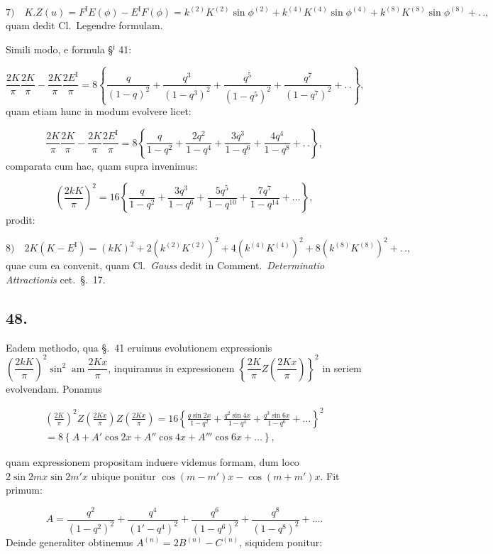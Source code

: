 \documentclass{article}
\begin{document}
\[
\text{7)}\quad K.Z(u)=F^{\mathrm{I}}E(\phi)-E^{\mathrm{I}}F(\phi)=k^{(2)}K^{(2)}\sin\phi^{(2)}+k^{(4)}K^{(4)}\sin\phi^{(4)}+k^{(8)}K^{(8)}\sin\phi^{(8)}+.\,.,
\]
quam dedit Cl.\ Legendre formulam.

Simili modo, e formula §$^{\mathrm{i}}$ 41:

\[
\frac{2K}{\pi}\frac{2K}{\pi}-\frac{2K}{\pi}\frac{2E^{\mathrm{I}}}{\pi}=8\left\{\frac{q}{(1-q)^{2}}+\frac{q^{3}}{(1-q^{3})^{2}}+\frac{q^{5}}{(1-q^{5})^{2}}+\frac{q^{7}}{(1-q^{7})^{2}}+.\,.\right\},
\]
quam etiam hunc in modum evolvere licet:

\[
\frac{2K}{\pi}\frac{2K}{\pi}-\frac{2K}{\pi}\frac{2E^{\mathrm{I}}}{\pi}=8\left\{\frac{q}{1-q^{2}}+\frac{2q^{2}}{1-q^{4}}+\frac{3q^{3}}{1-q^{6}}+\frac{4q^{4}}{1-q^{8}}+.\,.\right\},
\]
comparata cum hac, quam supra invenimus:

\[
\left(\frac{2kK}{\pi}\right)^{2}=16\left\{\frac{q}{1-q^{2}}+\frac{3q^{3}}{1-q^{6}}+\frac{5q^{5}}{1-q^{10}}+\frac{7q^{7}}{1-q^{14}}+\ldots\right\},
\]
prodit:

\[
\text{8)}\quad2K(K-E^{\mathrm{I}})=(kK)^{2}+2(k^{(2)}K^{(2)})^{2}+4(k^{(4)}K^{(4)})^{2}+8(k^{(8)}K^{(8)})^{2}+.\,.,
\]
quae cum ea convenit, quam Cl.\ \emph{Gauss} dedit in Comment.\ \emph{Determinatio Attractionis} cet.\ §.\ 17.

\subsection*{48.}

Eadem methodo, qua §.\ 41 eruimus evolutionem expressionis $\left(\dfrac{2kK}{\pi}\right)^{2}\sin^{2}\operatorname{am}\dfrac{2Kx}{\pi}$, inquiramus in expressionem $\left\{\dfrac{2K}{\pi}Z\left(\dfrac{2Kx}{\pi}\right)\right\}^{2}$ in seriem evolvendam. Ponamus

\[
\begin{gathered}
\left(\frac{2K}{\pi}\right)^{2}Z\left(\frac{2Kx}{\pi}\right)Z\left(\frac{2Kx}{\pi}\right)=16\left\{\frac{q\sin2x}{1-q^{2}}+\frac{q^{2}\sin4x}{1-q^{4}}+\frac{q^{3}\sin6x}{1-q^{6}}+\ldots\right\}^{2}\\[1ex]
=8\left\{A+A'\cos2x+A''\cos4x+A'''\cos6x+\ldots\right\},
\end{gathered}
\]

quam expressionem propositam induere videmus formam, dum loco $2\sin2mx\sin2m'x$ ubique ponitur $\cos(m-m')x-\cos(m+m')x$. Fit primum:

\[
A=\frac{q^{2}}{(1-q^{2})^{2}}+\frac{q^{4}}{(1'-q^{4})^{2}}+\frac{q^{6}}{(1-q^{6})^{2}}+\frac{q^{8}}{(1-q^{8})^{2}}+\ldots.
\]
Deinde generaliter obtinemus $A^{(n)}=2B^{(n)}-C^{(n)}$, siquidem ponitur:
\end{document}
